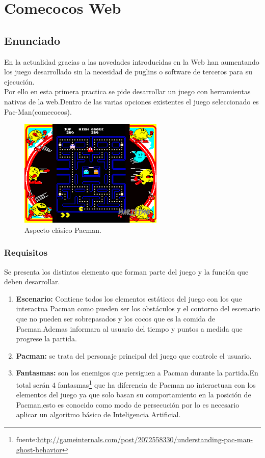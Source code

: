 \chapter{Comecocos Web} %
\section{Enunciado}
En la actualidad gracias a las novedades introducidas en la Web han aumentando los juego desarrollado sin la necesidad de puglins o software de terceros para su ejecución.
\\Por ello en esta primera practica se pide desarrollar un juego con herramientas nativas de la web.Dentro de las varias opciones existentes el juego seleccionado es Pac-Man(comecocos).
\begin{figure}[!h]
\begin{center}
   \includegraphics[width=0.5\linewidth]{Figures/Pacman_Intro}
	\decoRule
	\caption[Aspecto clásico Pacman]{Aspecto clásico Pacman.}
\label{fig:Pacman_Intro}
\end{center}
\end{figure}
\subsection{Requisitos}
Se presenta los distintos elemento que forman parte del juego y la función que deben desarrollar.
\begin{enumerate}
\item \textbf{Escenario:} Contiene todos los elementos estáticos del juego con los que interactua Pacman como pueden ser los obstáculos y el contorno del escenario que no pueden ser sobrepasados y los cocos que es la comida de Pacman.Ademas informara al usuario del tiempo y puntos a medida que progrese la partida.
\item \textbf{Pacman:} se trata del personaje principal del juego que controle el usuario.
\item \textbf{Fantasmas:} son los enemigos que persiguen a Pacman durante la partida.En total serán 4 fantasmas\footnote{fuente:\url{http://gameinternals.com/post/2072558330/understanding-pac-man-ghost-behavior}} que ha diferencia de Pacman no interactuan con los elementos del juego ya que solo basan su comportamiento en la posición de Pacman,esto es conocido como modo de persecución por lo es necesario aplicar un algoritmo básico de Inteligencia Artificial.
\end{enumerate}
